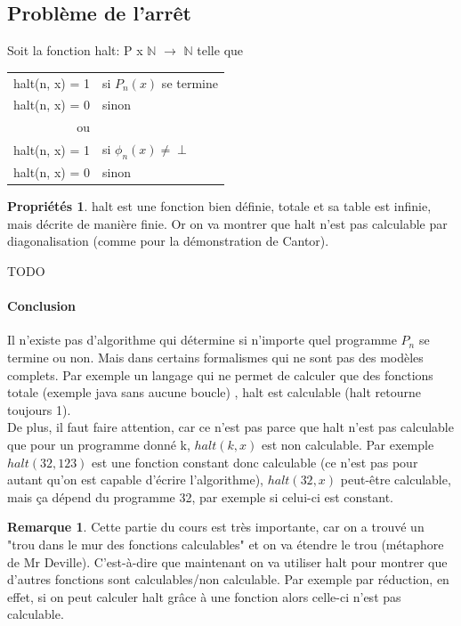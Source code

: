 \documentclass[11pt,a4paper]{article}
\newcommand{\N}{\mathbb{N}}
\theoremstyle{definition}
\newtheorem{myprop}[mydef]{Propriétés}
\newtheorem{myrem}[mydef]{Remarque}
\begin{document}

\subsection{Problème de l'arrêt}
\label{sub:probl_me_de_l_arr_t}

Soit la fonction halt: P x $\N$ $\rightarrow$ $\N$ telle que \\
\begin{tabular}{rl}
  halt(n, x) = 1 & si $P_n(x)$ se termine \\
  halt(n, x) = 0 & sinon \\
  ou &\\
  halt(n, x) = 1 & si $\phi_n(x)\neq \perp$ \\
  halt(n, x) = 0 & sinon \\
\end{tabular}

\begin{myprop}
	halt est une fonction bien définie, totale et sa table est infinie, mais décrite 
	de manière finie. Or on va montrer que halt n'est pas calculable par 
	diagonalisation (comme pour la démonstration de Cantor).\\
\end{myprop}

TODO \\

\paragraph{Conclusion} Il n'existe pas d'algorithme qui détermine si n'importe 
quel programme $P_n$ se termine ou non. Mais dans certains formalismes qui ne 
sont pas des modèles complets. Par exemple un langage qui ne permet de calculer 
que des fonctions totale (exemple java sans aucune boucle)
, halt est calculable (halt retourne toujours 1). \\

De plus, il faut faire attention, car ce n'est pas parce que halt n'est pas 
calculable que pour un programme donné k, $halt(k,x)$ est non calculable. Par 
exemple $halt(32,123)$ est une fonction constant donc calculable (ce n'est pas 
pour autant qu'on est capable d'écrire l'algorithme), $halt(32,x)$ peut-être 
calculable, mais ça dépend du 
programme 32, par exemple si celui-ci est constant.

\begin{myrem}
	Cette partie du cours est très importante, car on a trouvé un 
	"trou dans le mur des fonctions calculables" et on va étendre le trou (métaphore
	de Mr Deville). C'est-à-dire que maintenant on va utiliser halt pour montrer 
	que d'autres fonctions sont calculables/non calculable. Par exemple 
	par réduction, en effet, si on peut calculer halt grâce à une fonction 
	alors celle-ci n'est pas calculable.
\end{myrem}
\end{document}
